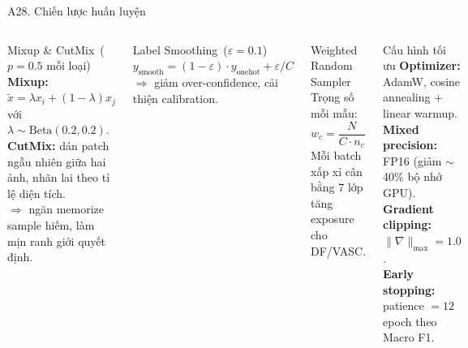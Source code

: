 \documentclass[10pt, aspectratio=169]{beamer}
\begin{document}
\begin{frame}{A28. Chiến lược huấn luyện}
    \begin{columns}[T]
        \begin{block}{Mixup \& CutMix\ \footnotesize($p = 0.5$ mỗi loại)}
            \scriptsize
            \textbf{Mixup:} $\tilde{x} = \lambda x_i + (1-\lambda) x_j$ với $\lambda \sim \mathrm{Beta}(0.2, 0.2)$.\\[2pt]
            \textbf{CutMix:} dán patch ngẫu nhiên giữa hai ảnh, nhãn lai theo tỉ lệ diện tích.\\[3pt]
            $\Rightarrow$ ngăn memorize sample hiếm, làm mịn ranh giới quyết định.
        \end{block}

        \begin{block}{Label Smoothing\ \footnotesize($\varepsilon = 0.1$)}
            \scriptsize
            $y_{\text{smooth}} = (1-\varepsilon) \cdot y_{\text{onehot}} + \varepsilon / C$\\[2pt]
            $\Rightarrow$ giảm over-confidence, cải thiện calibration.
        \end{block}

        \begin{block}{Weighted Random Sampler}
            \scriptsize
            Trọng số mỗi mẫu: $w_c = \dfrac{N}{C \cdot n_c}$\\[2pt]
            Mỗi batch xấp xỉ cân bằng 7 lớp \textemdash{} tăng exposure cho DF/VASC.
        \end{block}

        \begin{block}{Cấu hình tối ưu}
            \scriptsize
            \textbf{Optimizer:} AdamW, cosine annealing $+$ linear warmup.\\
            \textbf{Mixed precision:} FP16 (giảm $\sim$40\% bộ nhớ GPU).\\
            \textbf{Gradient clipping:} $\|\nabla\|_{\max} = 1.0$.\\
            \textbf{Early stopping:} patience $= 12$ epoch theo Macro F1.
        \end{block}
    \end{columns}
\end{frame}
\end{document}
